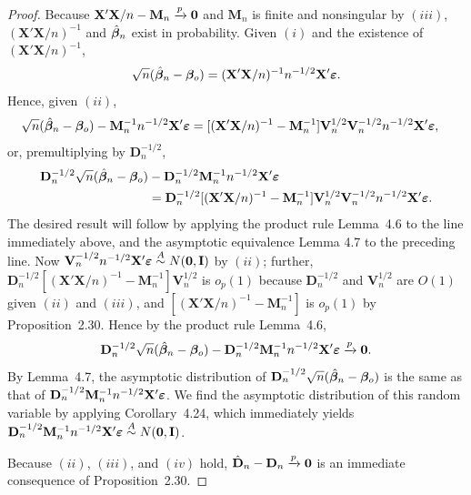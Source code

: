 \begin{proof}
Because $\mathbf{X}'\mathbf{X}/n - \mathbf{M}_n \xrightarrow{p} \mathbf{0}$ and $\mathbf{M}_n$ is finite and nonsingular by
$(iii)$, $(\mathbf{X}'\mathbf{X}/n)^{-1}$ and $\hat{\boldsymbol{\beta}}_n$ exist in probability. Given $(i)$ and the existence
of $(\mathbf{X}'\mathbf{X}/n)^{-1}$,
\[
\sqrt{n}(\hat{\boldsymbol{\beta}}_n - \boldsymbol{\beta}_o) = (\mathbf{X}'\mathbf{X}/n)^{-1}n^{-1/2}\mathbf{X}'\boldsymbol{\varepsilon}.
\]
Hence, given $(ii)$,
\begin{align*}
\sqrt{n}(\hat{\boldsymbol{\beta}}_n - \boldsymbol{\beta}_o) - \mathbf{M}_n^{-1}n^{-1/2}\mathbf{X}'\boldsymbol{\varepsilon}
&= [(\mathbf{X}'\mathbf{X}/n)^{-1} - \mathbf{M}_n^{-1}]\mathbf{V}_n^{1/2}\mathbf{V}_n^{-1/2}n^{-1/2}\mathbf{X}'\boldsymbol{\varepsilon},
\end{align*}
or, premultiplying by $\mathbf{D}_n^{-1/2}$,
\begin{align*}
\mathbf{D}_n^{-1/2}\sqrt{n}(\hat{\boldsymbol{\beta}}_n - \boldsymbol{\beta}_o) &- \mathbf{D}_n^{-1/2}\mathbf{M}_n^{-1}n^{-1/2}\mathbf{X}'\boldsymbol{\varepsilon} \\
&= \mathbf{D}_n^{-1/2}[(\mathbf{X}'\mathbf{X}/n)^{-1} - \mathbf{M}_n^{-1}]\mathbf{V}_n^{1/2}\mathbf{V}_n^{-1/2}n^{-1/2}\mathbf{X}'\boldsymbol{\varepsilon}.
\end{align*}
The desired result will follow by applying the product rule Lemma~4.6
to the line immediately above, and the asymptotic equivalence Lemma
4.7 to the preceding line. Now $\mathbf{V}_n^{-1/2}n^{-1/2}\mathbf{X}'\boldsymbol{\varepsilon} \overset{A}{\sim} N(\mathbf{0}, \mathbf{I})$ by $(ii)$; further,
$\mathbf{D}_n^{-1/2}[(\mathbf{X}'\mathbf{X}/n)^{-1} - \mathbf{M}_n^{-1}]\mathbf{V}_n^{1/2}$ is $o_p(1)$ because $\mathbf{D}_n^{-1/2}$ and $\mathbf{V}_n^{1/2}$ are $O(1)$
given $(ii)$ and $(iii)$, and $[(\mathbf{X}'\mathbf{X}/n)^{-1} - \mathbf{M}_n^{-1}]$ is $o_p(1)$ by Proposition~2.30.
Hence by the product rule Lemma~4.6,
\[
\mathbf{D}_n^{-1/2}\sqrt{n}(\hat{\boldsymbol{\beta}}_n - \boldsymbol{\beta}_o) - \mathbf{D}_n^{-1/2}\mathbf{M}_n^{-1}n^{-1/2}\mathbf{X}'\boldsymbol{\varepsilon} \xrightarrow{p} \mathbf{0}.
\]
By Lemma~4.7, the asymptotic distribution of $\mathbf{D}_n^{-1/2}\sqrt{n}(\hat{\boldsymbol{\beta}}_n - \boldsymbol{\beta}_o)$ is the
same as that of $\mathbf{D}_n^{-1/2}\mathbf{M}_n^{-1}n^{-1/2}\mathbf{X}'\boldsymbol{\varepsilon}$. We find the asymptotic distribution
of this random variable by applying Corollary~4.24, which immediately
yields $\mathbf{D}_n^{-1/2}\mathbf{M}_n^{-1}n^{-1/2}\mathbf{X}'\boldsymbol{\varepsilon} \overset{A}{\sim} N(\mathbf{0}, \mathbf{I})$.

Because $(ii)$, $(iii)$, and $(iv)$ hold, $\hat{\mathbf{D}}_n - \mathbf{D}_n \xrightarrow{p} \mathbf{0}$ is an immediate consequence of Proposition~2.30.
\end{proof}

